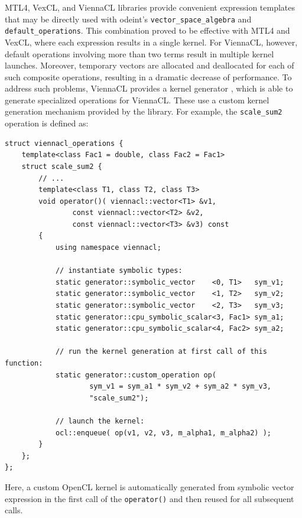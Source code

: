 \documentclass[final]{siamltex}
\newcommand{\code}[1]{\lstinline|#1|}
\begin{document}
\begin{sloppypar}
  MTL4, VexCL, and ViennaCL libraries provide convenient
  expression templates that may be directly used with odeint's
  \code{vector_space_algebra} and \code{default_operations}. This
  combination proved to be effective with MTL4 and VexCL, where each
  expression results in a single kernel. For ViennaCL, however,
  default operations involving more than two terms result in multiple
  kernel launches.  Moreover, temporary vectors are allocated and
  deallocated for each of such composite operations, resulting in a
  dramatic decrease of performance.  To address such problems,
  ViennaCL provides a kernel generator \cite{tillet:kernel-generator},
  which is able to generate specialized operations for ViennaCL. These
  use a custom kernel generation mechanism provided by the library.
  For example, the \code{scale_sum2} operation is defined as:
\begin{lstlisting}
struct viennacl_operations {
    template<class Fac1 = double, class Fac2 = Fac1>
    struct scale_sum2 {
        // ...
        template<class T1, class T2, class T3>
        void operator()( viennacl::vector<T1> &v1,
                const viennacl::vector<T2> &v2,
                const viennacl::vector<T3> &v3) const
        {
            using namespace viennacl;

            // instantiate symbolic types:
            static generator::symbolic_vector    <0, T1>   sym_v1;
            static generator::symbolic_vector    <1, T2>   sym_v2;
            static generator::symbolic_vector    <2, T3>   sym_v3;
            static generator::cpu_symbolic_scalar<3, Fac1> sym_a1;
            static generator::cpu_symbolic_scalar<4, Fac2> sym_a2;

            // run the kernel generation at first call of this function:
            static generator::custom_operation op(
                    sym_v1 = sym_a1 * sym_v2 + sym_a2 * sym_v3,
                    "scale_sum2");

            // launch the kernel:
            ocl::enqueue( op(v1, v2, v3, m_alpha1, m_alpha2) );
        }
    };
};
\end{lstlisting}
Here, a custom OpenCL kernel is automatically generated from symbolic vector
expression in the first call of the \code{operator()} and then reused for all
subsequent calls.
\end{sloppypar}
\end{document}

